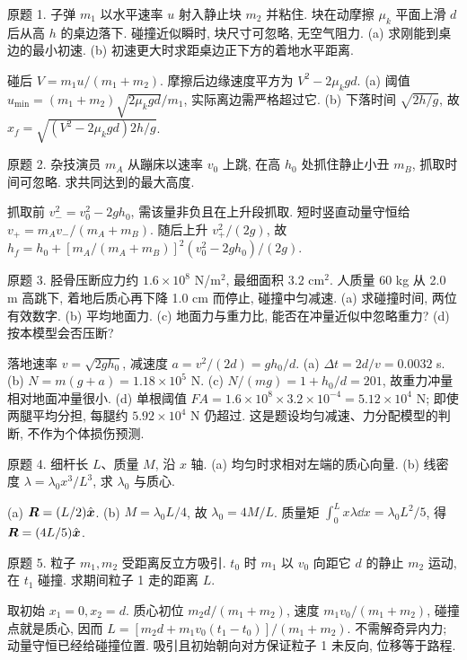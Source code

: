 \begin{exercise}
原题 1. 子弹 $m_1$ 以水平速率 $u$ 射入静止块 $m_2$ 并粘住. 块在动摩擦 $\mu_k$ 平面上滑 $d$ 后从高 $h$ 的桌边落下. 碰撞近似瞬时, 块尺寸可忽略, 无空气阻力. (a) 求刚能到桌边的最小初速. (b) 初速更大时求距桌边正下方的着地水平距离.
\end{exercise}
\begin{solution}
碰后 $V=m_1u/(m_1+m_2)$. 摩擦后边缘速度平方为 $V^2-2\mu_kgd$. (a) 阈值 $u_{\min}=(m_1+m_2)\sqrt{2\mu_kgd}/m_1$, 实际离边需严格超过它. (b) 下落时间 $\sqrt{2h/g}$, 故 $x_f=\sqrt{(V^2-2\mu_kgd)2h/g}$.
\end{solution}
\begin{exercise}
原题 2. 杂技演员 $m_A$ 从蹦床以速率 $v_0$ 上跳, 在高 $h_0$ 处抓住静止小丑 $m_B$, 抓取时间可忽略. 求共同达到的最大高度.
\end{exercise}
\begin{solution}
抓取前 $v_-^2=v_0^2-2gh_0$, 需该量非负且在上升段抓取. 短时竖直动量守恒给 $v_+=m_Av_-/(m_A+m_B)$. 随后上升 $v_+^2/(2g)$, 故 $h_f=h_0+[m_A/(m_A+m_B)]^2(v_0^2-2gh_0)/(2g)$.
\end{solution}
\begin{exercise}
原题 3. 胫骨压断应力约 $1.6\times10^8$ N/m$^2$, 最细面积 $3.2$ cm$^2$. 人质量 60 kg 从 2.0 m 高跳下, 着地后质心再下降 1.0 cm 而停止, 碰撞中匀减速. (a) 求碰撞时间, 两位有效数字. (b) 平均地面力. (c) 地面力与重力比, 能否在冲量近似中忽略重力? (d) 按本模型会否压断?
\end{exercise}
\begin{solution}
落地速率 $v=\sqrt{2gh_0}$, 减速度 $a=v^2/(2d)=gh_0/d$. (a) $\Delta t=2d/v=0.0032$ s. (b) $N=m(g+a)=1.18\times10^5$ N. (c) $N/(mg)=1+h_0/d=201$, 故重力冲量相对地面冲量很小. (d) 单根阈值 $FA=1.6\times10^8\times3.2\times10^{-4}=5.12\times10^4$ N; 即使两腿平均分担, 每腿约 $5.92\times10^4$ N 仍超过. 这是题设均匀减速、力分配模型的判断, 不作为个体损伤预测.
\end{solution}
\begin{exercise}
原题 4. 细杆长 $L$、质量 $M$, 沿 $x$ 轴. (a) 均匀时求相对左端的质心向量. (b) 线密度 $\lambda=\lambda_0x^3/L^3$, 求 $\lambda_0$ 与质心.
\end{exercise}
\begin{solution}
(a) $\boldsymbol{R}=(L/2)\hat{\boldsymbol{x}}$. (b) $M=\lambda_0L/4$, 故 $\lambda_0=4M/L$. 质量矩 $\int_0^Lx\lambda\dd x=\lambda_0L^2/5$, 得 $\boldsymbol{R}=(4L/5)\hat{\boldsymbol{x}}$.
\end{solution}
\begin{exercise}
原题 5. 粒子 $m_1,m_2$ 受距离反立方吸引. $t_0$ 时 $m_1$ 以 $v_0$ 向距它 $d$ 的静止 $m_2$ 运动, 在 $t_1$ 碰撞. 求期间粒子 1 走的距离 $L$.
\end{exercise}
\begin{solution}
取初始 $x_1=0,x_2=d$. 质心初位 $m_2d/(m_1+m_2)$, 速度 $m_1v_0/(m_1+m_2)$, 碰撞点就是质心, 因而 $L=[m_2d+m_1v_0(t_1-t_0)]/(m_1+m_2)$. 不需解奇异内力; 动量守恒已经给碰撞位置. 吸引且初始朝向对方保证粒子 1 未反向, 位移等于路程.
\end{solution}
